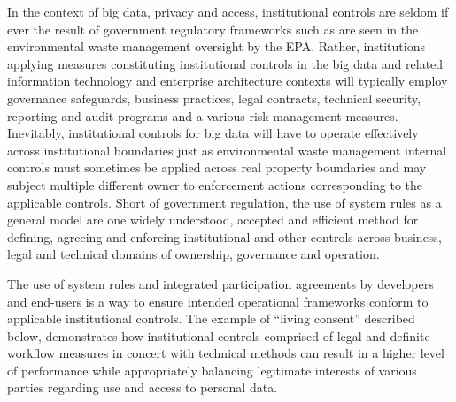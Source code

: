 In the context of big data, privacy and access, institutional controls are seldom if ever the result of government regulatory frameworks such as are seen in the environmental waste management oversight by the EPA.
Rather, institutions applying measures constituting institutional controls in the big data and related information technology and enterprise architecture contexts will typically employ governance safeguards, business practices, legal contracts, technical security, reporting and audit programs and a various risk management measures.
Inevitably, institutional controls for big data will have to operate effectively across institutional boundaries just as environmental waste management internal controls must sometimes be applied across real property boundaries and may subject multiple different owner to enforcement actions corresponding to the applicable controls.
Short of government regulation, the use of system rules as a general model are one widely understood, accepted and efficient method for defining, agreeing and enforcing institutional and other controls across business, legal and technical domains of ownership, governance and operation.

The use of system rules and integrated participation agreements by developers and end-users is a way to ensure intended operational frameworks conform to applicable institutional controls.
The example of ``living consent'' described below, demonstrates how institutional controls comprised of legal and definite workflow measures in concert with technical methods can result in a higher level of performance while appropriately balancing legitimate interests of various parties regarding use and access to personal data.


